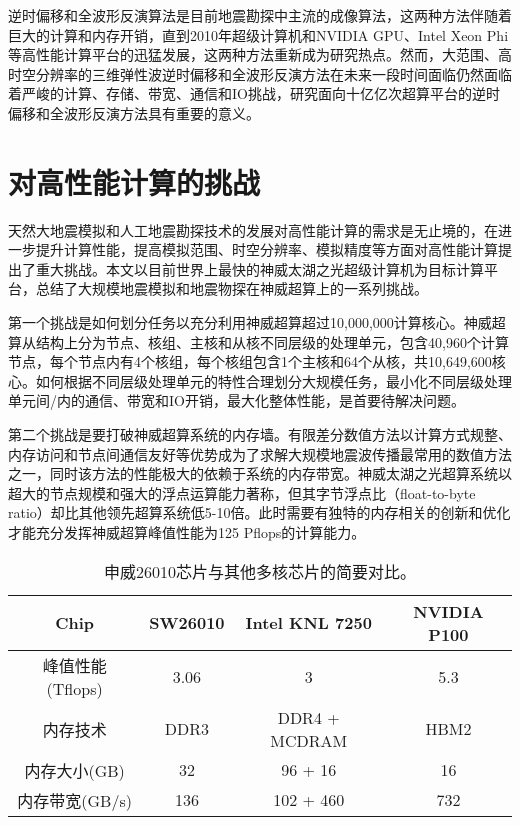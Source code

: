 逆时偏移和全波形反演算法是目前地震勘探中主流的成像算法，这两种方法伴随着巨大的计算和内存开销，直到2010年超级计算机和NVIDIA GPU、Intel Xeon Phi 等高性能计算平台的迅猛发展，这两种方法重新成为研究热点。然而，大范围、高时空分辨率的三维弹性波逆时偏移和全波形反演方法在未来一段时间面临仍然面临着严峻的计算、存储、带宽、通信和IO挑战，研究面向十亿亿次超算平台的逆时偏移和全波形反演方法具有重要的意义。

\section{对高性能计算的挑战}

天然大地震模拟和人工地震勘探技术的发展对高性能计算的需求是无止境的，在进一步提升计算性能，提高模拟范围、时空分辨率、模拟精度等方面对高性能计算提出了重大挑战。本文以目前世界上最快的神威太湖之光超级计算机为目标计算平台，总结了大规模地震模拟和地震物探在神威超算上的一系列挑战。

第一个挑战是如何划分任务以充分利用神威超算超过10,000,000计算核心。神威超算从结构上分为节点、核组、主核和从核不同层级的处理单元，包含40,960个计算节点，每个节点内有4个核组，每个核组包含1个主核和64个从核，共10,649,600核心。如何根据不同层级处理单元的特性合理划分大规模任务，最小化不同层级处理单元间/内的通信、带宽和IO开销，最大化整体性能，是首要待解决问题。

第二个挑战是要打破神威超算系统的内存墙。有限差分数值方法以计算方式规整、内存访问和节点间通信友好等优势成为了求解大规模地震波传播最常用的数值方法之一，同时该方法的性能极大的依赖于系统的内存带宽。神威太湖之光超算系统以超大的节点规模和强大的浮点运算能力著称，但其字节浮点比（float-to-byte ratio）却比其他领先超算系统低5-10倍。此时需要有独特的内存相关的创新和优化才能充分发挥神威超算峰值性能为125 Pflops的计算能力。

\begin{table}[ht]
\caption{申威26010芯片与其他多核芯片的简要对比。}
\label{tb:proc-comp}
\centering
\begin{tabular*}{0.8\columnwidth}{cccc}
\hline\hline
    Chip & SW26010 & Intel KNL 7250 & NVIDIA P100 \\\hline
    峰值性能 (Tflops) & 3.06 & 3 & 5.3 \\\hline
    内存技术   & DDR3 & DDR4 + MCDRAM & HBM2 \\\hline
    内存大小(GB) & 32 & 96 + 16 & 16 \\\hline
    内存带宽(GB/s)  & 136 & 102 + 460 & 732 \\\hline
\hline
\end{tabular*}
\end{table}

